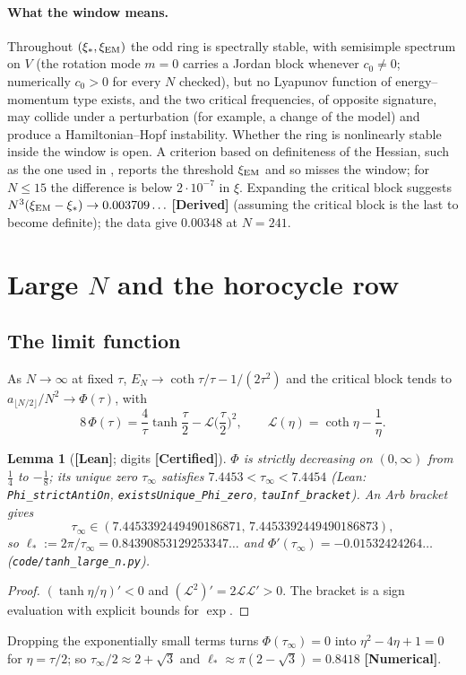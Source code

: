 \documentclass[11pt]{article}
\newtheorem{lemma}[theorem]{Lemma}
\theoremstyle{definition}
\theoremstyle{remark}
\newcommand{\st}[1]{\textbf{[#1]}}
\newcommand{\lean}[1]{\nolinkurl{#1}}
\newcommand{\Lan}{\mathcal L}
\begin{document}
\paragraph{What the window means.} Throughout $(\xi_*,\xi_{\rm EM})$ the odd ring is spectrally stable, with semisimple
spectrum on $V$ (the rotation mode $m=0$ carries a Jordan block whenever $c_0\neq0$; numerically $c_0>0$ for every $N$ checked), but no Lyapunov function of energy--momentum type exists, and the two critical frequencies, of opposite
signature, may collide under a perturbation (for example, a change of the model) and produce a Hamiltonian--Hopf instability.
Whether the ring is nonlinearly stable inside the window is open. A criterion based on definiteness of the Hessian, such as the
one used in \cite{Boatto2008}, reports the threshold $\xi_{\rm EM}$ and so misses the window; for $N\le15$ the difference is
below $2\cdot10^{-7}$ in $\xi$. Expanding the critical block suggests $N^3(\xi_{\rm EM}-\xi_*)\to0.003709\ldots$ \st{Derived}
(assuming the critical block is the last to become definite); the data give $0.00348$ at $N=241$.

\section{\texorpdfstring{Large $N$}{Large N} and the horocycle row}\label{sec:largeN}

\subsection{The limit function}
As $N\to\infty$ at fixed $\tau$, $E_N\to\coth\tau/\tau-1/(2\tau^2)$ and the critical block tends to
$a_{\lfloor N/2\rfloor}/N^2\to\Phi(\tau)$, with
\begin{equation}\label{eq:Phi}
8\,\Phi(\tau)=\frac4\tau\tanh\frac\tau2-\Lan\Big(\frac\tau2\Big)^2,\qquad \Lan(\eta)=\coth\eta-\frac1\eta .
\end{equation}
\begin{lemma}[\st{Lean}; digits \st{Certified}]\label{lem:Phi}
$\Phi$ is strictly decreasing on $(0,\infty)$ from $\frac14$ to $-\frac18$; its unique zero $\tau_\infty$ satisfies
$7.4453<\tau_\infty<7.4454$ (Lean: \lean{Phi_strictAntiOn}, \lean{existsUnique_Phi_zero}, \lean{tauInf_bracket}). An Arb
bracket gives
\[
\tau_\infty\in(7.4453392449490186871,\,7.4453392449490186873),
\]
so $\ell_*:=2\pi/\tau_\infty=0.84390853129253347\ldots$ and
$\Phi'(\tau_\infty)=-0.01532424264\ldots$ (\nolinkurl{code/tanh_large_n.py}).
\end{lemma}
\begin{proof}
$(\tanh\eta/\eta)'<0$ and $(\Lan^2)'=2\Lan\Lan'>0$. The bracket is a sign evaluation with explicit bounds for $\exp$.
\end{proof}
Dropping the exponentially small terms turns $\Phi(\tau_\infty)=0$ into $\eta^2-4\eta+1=0$ for $\eta=\tau/2$; so
$\tau_\infty/2\approx2+\sqrt3$ and $\ell_*\approx\pi(2-\sqrt3)=0.8418$ \st{Numerical}.
\end{document}
